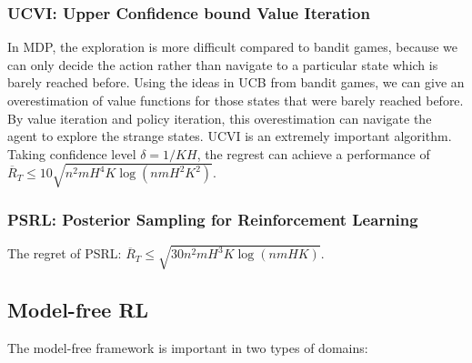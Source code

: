 \documentclass[10pt]{report}
\begin{document}
\subsubsection{UCVI: Upper Confidence bound Value Iteration}
In MDP, the exploration is more difficult compared to bandit games, because we can only decide the action rather than navigate to a
particular state which is barely reached before. Using the ideas in UCB from bandit games, we can give an overestimation of value functions
for those states that were barely reached before. By value iteration and policy iteration, this overestimation can navigate the
agent to explore the strange states.
UCVI is an extremely important algorithm. Taking confidence level $\delta=1/KH$, the regrest can achieve a performance of $\overline{R}_T\leq10\sqrt{n^2mH^4K\log(nmH^2K^2)}.$

\subsubsection{PSRL: Posterior Sampling for Reinforcement Learning}
The regret of PSRL: $\overline{R}_T\leq\sqrt{30n^2mH^3K\log(nmHK)}.$

\subsection{Model-free RL}

The model-free framework is important in two types of domains:
\end{document}
